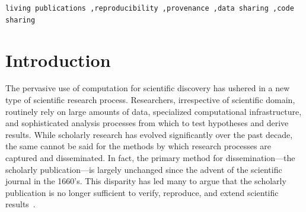 \documentclass{elsarticle}
\newcommand{\wt}{Whole\,Tale}
\begin{document}
\begin{frontmatter}
\begin{abstract}
The act of sharing scientific knowledge is rapidly evolving away from traditional articles and presentations to the delivery of executable objects that integrate the data and computational details (e.g., scripts and workflows) upon which the findings rely. This envisioned coupling of data 
and process is essential to advancing science but faces 
technical and institutional barriers. The \wt\ project aims to address these barriers by connecting computational, data-intensive research 
efforts with the larger research process---transforming the knowledge discovery 
and dissemination process into one where data products are united with research articles 
to create ``living publications'' or \emph{tales}. The \wt\ focuses on the full spectrum of science, empowering users in the long tail of science, and power users with demands for access to big data and compute resources. We report here on the design, architecture, and implementation of the \wt\ environment. 
\end{abstract}

\begin{keyword}
\texttt{living publications \sep reproducibility \sep provenance  \sep data sharing \sep code sharing}
\end{keyword}

\end{frontmatter}


\section{Introduction}\label{sec:intro}

The pervasive use of computation for scientific discovery has ushered in a new type of scientific research process. Researchers, irrespective of scientific domain, routinely rely on large amounts of data, specialized computational infrastructure, 
and sophisticated analysis processes from which to test hypotheses and derive
results. While scholarly research has evolved significantly over the past decade, 
the same cannot be said for the methods by which research processes are captured and disseminated. 
In fact, the primary method for dissemination---the scholarly publication---is largely unchanged since the advent of the scientific journal in the 1660’s. This disparity has led many to
argue that the scholarly publication is no longer sufficient to verify, reproduce, 
and extend scientific results~\cite{peng11reproducible, kratz14datapub, alsheikh11public,stodden_setting_2012,donoho_reproducible_2009,stodden_implementing_2014}.
\end{document}
